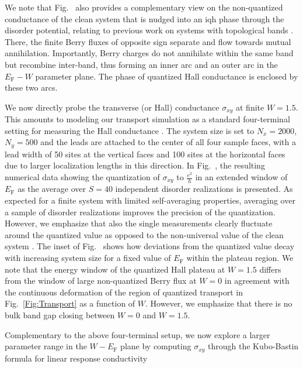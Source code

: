 \documentclass[aps,prb,amsmath,amssymb,twocolumn, superscriptaddress]{revtex4-2}
\begin{document}
We note that Fig.~ also provides a complementary view on the non-quantized conductance of the clean system that is nudged into an \gls{iqh} phase through the disorder potential, relating to previous work on systems with topological bands \cite{Laughlin_IQH_2, Floquet_levitation, Fine_structure}. There, the finite Berry fluxes of opposite sign separate and flow towards mutual annihilation. Importantly, Berry charges do not annihilate within the same band but recombine inter-band, thus forming an inner arc and an outer arc in the $E_\mathrm{F}-W$ parameter plane. The phase of quantized Hall conductance is enclosed by these two arcs.

We now directly probe the transverse (or Hall) conductance $\sigma_{xy}$ at finite $W = 1.5$. This amounts to modeling our transport simulation as a standard four-terminal setting for measuring the Hall conductance \cite{Datta, 4_terminal_Hall}. The system size is set to $N_x = 2000$, $N_y = 500$ and the leads are attached to the center of all four sample faces, with a lead width of 50 sites at the vertical faces and 100 sites at the horizontal faces due to larger localization lengths in this direction. In Fig.~, the resulting numerical data showing the quantization of $\sigma_{xy}$ to $\frac{e^2}{h}$ in an extended window of $E_\mathrm{F}$ as the average over $S = 40$ independent disorder realizations is presented. As expected for a finite system with limited self-averaging properties, averaging over a sample of disorder realizations improves the precision of the quantization. However, we emphasize that also the single measurements clearly fluctuate around the quantized value as opposed to the non-universal value of the clean system \cite{Supplemental}. The inset of Fig.~ shows how deviations from the quantized value decay with increasing system size for a fixed value of $E_\mathrm{F}$ within the plateau region. We note that the energy window of the quantized Hall plateau at $W = 1.5$ differs from the window of large non-quantized Berry flux at $W = 0$ in agreement with the continuous deformation of the region of quantized transport in Fig.~\ref{Fig:Transport} as a function of $W$. However, we emphasize that there is no bulk band gap closing between $W=0$ and $W=1.5$.

Complementary to the above four-terminal setup, we now explore a larger parameter range in the $W-E_\mathrm{F}$ plane by computing $\sigma_{xy}$ through the Kubo-Bastin formula \cite{Kubo_paper, Kubo_Bastin, Kubo_Bastin_modern} for linear response conductivity 
\end{document}
